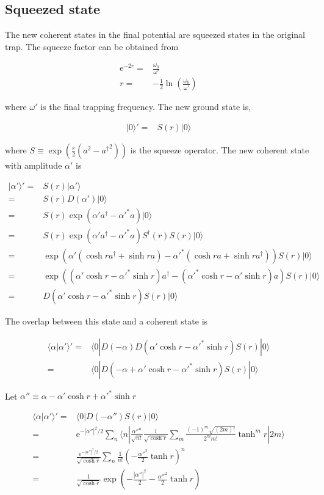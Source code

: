 \documentclass[10pt,fleqn]{article}
\newcommand{\ue}{\mathrm{e}}
\newcommand{\eqar}[1]
{
  \begin{align*}
    #1
  \end{align*}
}
\newcommand{\paren}[1]{{\left({#1}\right)}}
\newcommand{\abs}[1]{{\left|{#1}\right|}}
\begin{document}
\subsection{Squeezed state}
The new coherent states in the final potential are squeezed states in the original trap. The squeeze factor can be obtained from
\eqar{
  \ue^{-2r}=&\frac{\omega_0}{\omega'}\\
  r=&-\frac12\ln\paren{\frac{\omega_0}{\omega'}}
}
where $\omega'$ is the final trapping frequency.
The new ground state is,
\eqar{
  |0\rangle'=&S\paren{r}|0\rangle
}
where $\displaystyle S\equiv\exp\paren{\frac{r}2\paren{a^2-{a^\dagger}^2}}$ is the squeeze operator.
The new coherent state with amplitude $\alpha'$ is
\eqar{
  |\alpha'\rangle'=&S\paren{r}|\alpha'\rangle\\
  =&S\paren{r}D\paren{\alpha'}|0\rangle\\
  =&S\paren{r}\exp\paren{\alpha'a^\dagger-\alpha'^*a}|0\rangle\\
  =&S\paren{r}\exp\paren{\alpha'a^\dagger-\alpha'^*a}S^\dagger\paren{r}S\paren{r}|0\rangle\\
  =&\exp\paren{\alpha'\paren{\cosh r a^\dagger+\sinh r a}-\alpha'^*\paren{\cosh r a+\sinh r a^\dagger}}S\paren{r}|0\rangle\\
  =&\exp\paren{\paren{\alpha'\cosh r-\alpha'^*\sinh r}a^\dagger-\paren{\alpha'^*\cosh r-\alpha'\sinh r}a}S\paren{r}|0\rangle\\
  =&D\paren{\alpha'\cosh r-\alpha'^*\sinh r}S\paren{r}|0\rangle
}
The overlap between this state and a coherent state is
\eqar{
  \langle\alpha|\alpha'\rangle'=&\langle0|D\paren{-\alpha}D\paren{\alpha'\cosh r-\alpha'^*\sinh r}S\paren{r}|0\rangle\\
  =&\langle0|D\paren{-\alpha+\alpha'\cosh r-\alpha'^*\sinh r}S\paren{r}|0\rangle
}
Let $\alpha''\equiv\alpha-\alpha'\cosh r+\alpha'^*\sinh r$
\eqar{
  \langle\alpha|\alpha'\rangle'=&\langle0|D\paren{-\alpha''}S\paren{r}|0\rangle\\
  =&\ue^{-\abs{\alpha''}^2/2}\sum_{n}\langle n|\frac{{\alpha''}^n}{\sqrt{n!}}
  \frac1{\sqrt{\cosh r}}\sum_{m}\frac{\paren{-1}^m\sqrt{(2m)!}}{2^mm!}\tanh^mr|2m\rangle\\
  =&\frac{\ue^{-\abs{\alpha''}^2/2}}{\sqrt{\cosh r}}\sum_{n}\frac{1}{n!}\paren{-\frac{\alpha''^2}{2}\tanh r}^n\\
  =&\frac{1}{\sqrt{\cosh r}}\exp\paren{-\frac{\abs{\alpha''}^2}2-\frac{\alpha''^2}{2}\tanh r}
}
\end{document}
